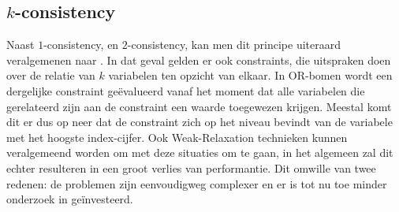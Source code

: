 \subsection{$k$-consistency}
Naast $1$-consistency, en $2$-consistency, kan men dit principe uiteraard veralgemenen naar . In dat geval gelden er ook constraints, die uitspraken doen over de relatie van $k$ variabelen ten opzicht van elkaar. In OR-bomen wordt een dergelijke constraint ge\"evalueerd vanaf het moment dat alle variabelen die gerelateerd zijn aan de constraint een waarde toegewezen krijgen. Meestal komt dit er dus op neer dat de constraint zich op het niveau bevindt van de variabele met het hoogste index-cijfer. Ook Weak-Relaxation technieken kunnen veralgemeend worden om met deze situaties om te gaan, in het algemeen zal dit echter resulteren in een groot verlies van performantie. Dit omwille van twee redenen: de problemen zijn eenvoudigweg complexer en er is tot nu toe minder onderzoek in ge\"investeerd.

